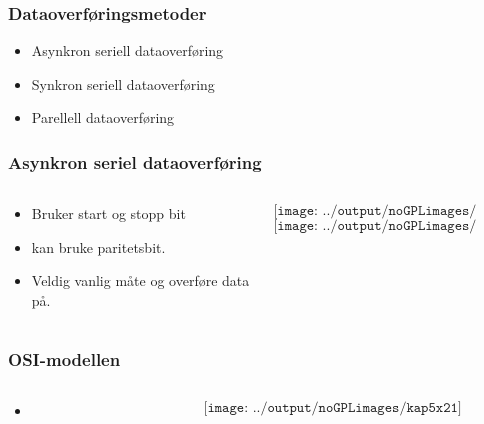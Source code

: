 \documentclass[aspectratio=169,xcolor=dvipsnames]{beamer}
\begin{document}
\begin{frame}
	\frametitle{Dataoverføringsmetoder}
	\begin{itemize}
		\item Asynkron seriell dataoverføring
		\item Synkron seriell dataoverføring
		\item Parellell dataoverføring
	\end{itemize}
\end{frame}

\begin{frame}
	\frametitle{Asynkron seriel dataoverføring}
	\begin{columns}
		\begin{column}{0.5\textwidth}

			\begin{itemize}
				\item Bruker start og stopp bit
				\item kan bruke paritetsbit. 
				\item Veldig vanlig måte og overføre data på. 
			\end{itemize}

			
		\end{column}

		\begin{column}{0.5\textwidth}
	$$\texttt{[image: ../output/noGPLimages/kap5x08]}$$
	$$\texttt{[image: ../output/noGPLimages/kap5x09]}$$
		\end{column}
	\end{columns}
\end{frame}
\begin{frame}
	\frametitle{OSI-modellen}
	\begin{columns}
		\begin{column}{0.5\textwidth}

			\begin{itemize}
				\item 
			\end{itemize}

			
		\end{column}

		\begin{column}{0.5\textwidth}
	$$\texttt{[image: ../output/noGPLimages/kap5x21]}$$
		\end{column}
	\end{columns}
\end{frame}
\end{document}
